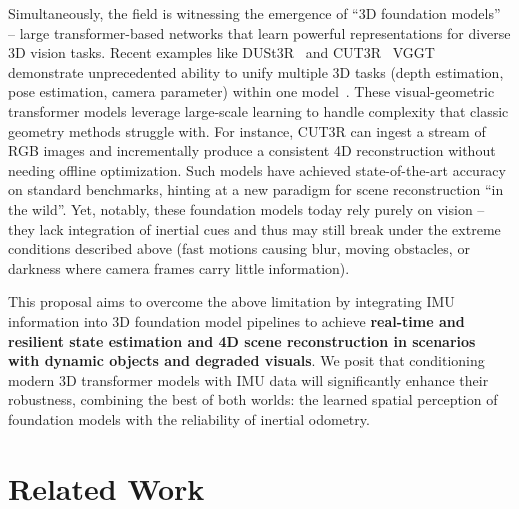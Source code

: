 Simultaneously, the field is witnessing the emergence of “3D foundation models” – large transformer-based networks that learn powerful representations for diverse 3D vision tasks. Recent examples like DUSt3R~\cite{wang2024dust3r} and CUT3R~\cite{wang2025continuous} VGGT~\cite{wang2025vggt} demonstrate unprecedented ability to unify multiple 3D tasks (depth estimation, pose estimation, camera parameter) within one model~\cite{wang2025vggt}. These visual-geometric transformer models leverage large-scale learning to handle complexity that classic geometry methods struggle with. For instance, CUT3R can ingest a stream of RGB images and incrementally produce a consistent 4D reconstruction without needing offline optimization. Such models have achieved state-of-the-art accuracy on standard benchmarks, hinting at a new paradigm for scene reconstruction “in the wild”. Yet, notably, these foundation models today rely purely on vision – they lack integration of inertial cues and thus may still break under the extreme conditions described above (fast motions causing blur, moving obstacles, or darkness where camera frames carry little information).



This proposal aims to overcome the above limitation by integrating IMU information into 3D foundation model pipelines to achieve \textbf{real-time and resilient state estimation and 4D scene reconstruction in scenarios with dynamic objects and degraded visuals}. We posit that conditioning modern 3D transformer models with IMU data will significantly enhance their robustness, combining the best of both worlds: the learned spatial perception of foundation models with the reliability of inertial odometry. 




\section{Related Work}
